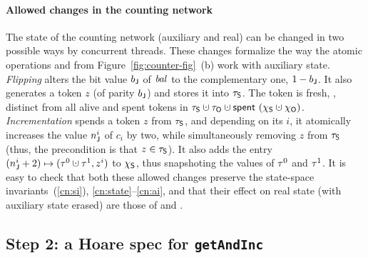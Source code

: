 

%
%
%

\paragraph{Allowed changes in the counting network}
\label{sec:count-netw-prot}


The state of the counting network (auxiliary and real) can be changed
in two possible ways by concurrent threads. These changes formalize
the way the atomic operations  and  from
Figure~\ref{fig:counter-fig}~(b) work with auxiliary state.
%
\emph{Flipping} alters the bit value $b_{\mathsf{J}}$ of $\mathit{bal}$ to the
complementary one, $1 - b_{\mathsf{J}}$.
%
It also generates a token $z$ (of parity $b_{\mathsf{J}}$) and stores it
into $\tau_{\mathsf{S}}$. The token is fresh, \ie, distinct from all alive and
spent tokens in $\tkns \hunion \tkno \hunion{\Tomb~(\hists
  \hunion \histo)}$.
%
\emph{Incrementation} spends a token $z$ from $\tau_{\mathsf{S}}$, and depending
on its $i$, it atomically increases the value $n^i_{\mathsf{J}}$ of $c_i$ by
two, while simultaneously removing $z$ from $\tau_{\mathsf{S}}$ (thus, the
precondition is that $z \in \tau_{\mathsf{S}}$). It also adds the entry
$(n^i_\joint + 2) \hpts (\tkn^0 \hunion \tkn^1, z^i)$ to $\chi_{\mathsf{S}}$,
thus snapshoting the values of $\tau^0$ and $\tau^1$.
%
It is easy to check that both these allowed changes preserve the
state-space invariants~(\ref{cn:si}), \ref{cn:state}--\ref{cn:ai}, and
that their effect on real state (with auxiliary state erased) are
those of  and .

\subsection{Step 2: a Hoare spec for \texttt{getAndInc}}
\label{sec:spec-gaa}

